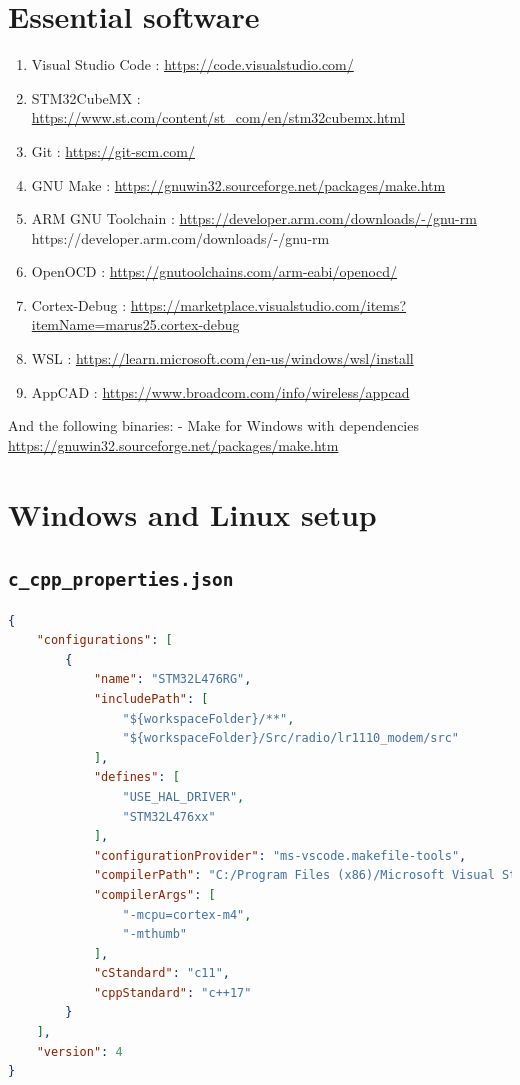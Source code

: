 \begin{appendices}
\section{Essential software}  \label{app:software}
\begin{enumerate}
    \item Visual Studio Code : \url{https://code.visualstudio.com/} \label{app:software:vsc}
    \item STM32CubeMX : \url{https://www.st.com/content/st_com/en/stm32cubemx.html} \label{app:software:stm32cubemx}
    \item Git : \url{https://git-scm.com/} \label{app:software:git}
    \item GNU Make : \url{https://gnuwin32.sourceforge.net/packages/make.htm} \label{app:software:make}
    \item ARM GNU Toolchain : \url{https://developer.arm.com/downloads/-/gnu-rm}
    https://developer.arm.com/downloads/-/gnu-rm
    \label{app:software:arm_toolchain}
    \item OpenOCD : \url{https://gnutoolchains.com/arm-eabi/openocd/} \label{app:software:openocd}
    \item Cortex-Debug : \url{https://marketplace.visualstudio.com/items?itemName=marus25.cortex-debug} \label{app:software:cortex_debug}
    \item WSL : \url{https://learn.microsoft.com/en-us/windows/wsl/install} \label{app:software:wsl}
    \item AppCAD : \url{https://www.broadcom.com/info/wireless/appcad} \label{app:software:appcad}
\end{enumerate}

And the following binaries:
- Make for Windows with dependencies \url{https://gnuwin32.sourceforge.net/packages/make.htm} 

\section{Windows and Linux setup}
\subsection*{\lstinline[style=bash]{c_cpp_properties.json}} \label{app:software:c_cpp_properties}
\begin{lstlisting}[language=json]
{
    "configurations": [
        {
            "name": "STM32L476RG",
            "includePath": [
                "${workspaceFolder}/**",
                "${workspaceFolder}/Src/radio/lr1110_modem/src"
            ],
            "defines": [
                "USE_HAL_DRIVER",
                "STM32L476xx"
            ],
            "configurationProvider": "ms-vscode.makefile-tools",
            "compilerPath": "C:/Program Files (x86)/Microsoft Visual Studio/2022/BuildTools/VC/Tools/MSVC/14.38.33130/bin/Hostx64/x64/cl.exe", // Use "which arm-none-eabi-gcc" to get the location of the compiler in linux
            "compilerArgs": [
                "-mcpu=cortex-m4",
                "-mthumb"
            ],
            "cStandard": "c11",
            "cppStandard": "c++17"
        }
    ],
    "version": 4
}
\end{lstlisting}


\end{appendices}
